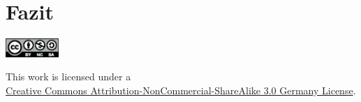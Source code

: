 \documentclass[10pt,a4paper]{article}
\begin{document}
\section{Fazit}
\label{l:fazit}




\bigskip

\begin{center}
\includegraphics[width=0.15\textwidth]{media/by-nc-sa.eps}

\begin{small}
This work is licensed under a\\\href{http://creativecommons.org/licenses/by-nc-sa/3.0/de/}{Creative Commons Attribution-NonCommercial-ShareAlike 3.0 Germany License}.
\end{small}


\end{center}
\end{document}
